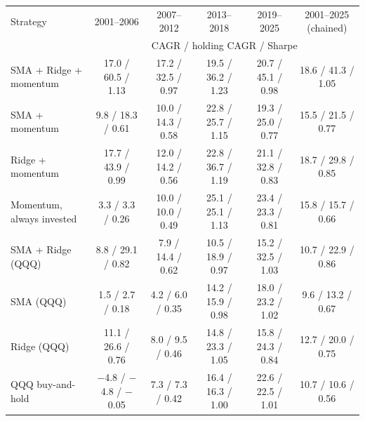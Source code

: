 \begin{tabular}{lccccc}
\toprule
Strategy & 2001--2006 & 2007--2012 & 2013--2018 & 2019--2025 & 2001--2025 (chained) \\
 & \multicolumn{5}{c}{\footnotesize CAGR / holding CAGR / Sharpe} \\
\midrule
SMA + Ridge + momentum & 17.0 / 60.5 / 1.13 & 17.2 / 32.5 / 0.97 & 19.5 / 36.2 / 1.23 & 20.7 / 45.1 / 0.98 & 18.6 / 41.3 / 1.05 \\
SMA + momentum & 9.8 / 18.3 / 0.61 & 10.0 / 14.3 / 0.58 & 22.8 / 25.7 / 1.15 & 19.3 / 25.0 / 0.77 & 15.5 / 21.5 / 0.77 \\
Ridge + momentum & 17.7 / 43.9 / 0.99 & 12.0 / 14.2 / 0.56 & 22.8 / 36.7 / 1.19 & 21.1 / 32.8 / 0.83 & 18.7 / 29.8 / 0.85 \\
Momentum, always invested & 3.3 / 3.3 / 0.26 & 10.0 / 10.0 / 0.49 & 25.1 / 25.1 / 1.13 & 23.4 / 23.3 / 0.81 & 15.8 / 15.7 / 0.66 \\
\addlinespace
SMA + Ridge (QQQ) & 8.8 / 29.1 / 0.82 & 7.9 / 14.4 / 0.62 & 10.5 / 18.9 / 0.97 & 15.2 / 32.5 / 1.03 & 10.7 / 22.9 / 0.86 \\
SMA (QQQ) & 1.5 / 2.7 / 0.18 & 4.2 / 6.0 / 0.35 & 14.2 / 15.9 / 0.98 & 18.0 / 23.2 / 1.02 & 9.6 / 13.2 / 0.67 \\
Ridge (QQQ) & 11.1 / 26.6 / 0.76 & 8.0 / 9.5 / 0.46 & 14.8 / 23.3 / 1.05 & 15.8 / 24.3 / 0.84 & 12.7 / 20.0 / 0.75 \\
QQQ buy-and-hold & $-$4.8 / $-$4.8 / $-$0.05 & 7.3 / 7.3 / 0.42 & 16.4 / 16.3 / 1.00 & 22.6 / 22.5 / 1.01 & 10.7 / 10.6 / 0.56 \\
\bottomrule
\end{tabular}
